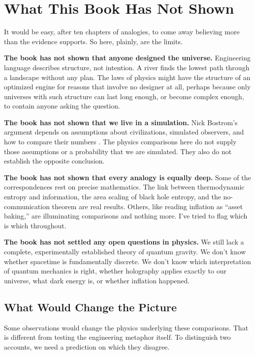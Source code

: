 \section{What This Book Has Not Shown}

It would be easy, after ten chapters of analogies, to come away believing more than the evidence supports. So here, plainly, are the limits.

\textbf{The book has not shown that anyone designed the universe.} Engineering language describes structure, not intention. A river finds the lowest path through a landscape without any plan. The laws of physics might have the structure of an optimized engine for reasons that involve no designer at all, perhaps because only universes with such structure can last long enough, or become complex enough, to contain anyone asking the question.

\textbf{The book has not shown that we live in a simulation.} Nick Bostrom's argument depends on assumptions about civilizations, simulated observers, and how to compare their numbers \cite{bostrom2003}. The physics comparisons here do not supply those assumptions or a probability that we are simulated. They also do not establish the opposite conclusion.

\textbf{The book has not shown that every analogy is equally deep.} Some of the correspondences rest on precise mathematics. The link between thermodynamic entropy and information, the area scaling of black hole entropy, and the no-communication theorem are real results. Others, like reading inflation as ``asset baking,'' are illuminating comparisons and nothing more. I've tried to flag which is which throughout.

\textbf{The book has not settled any open questions in physics.} We still lack a complete, experimentally established theory of quantum gravity. We don't know whether spacetime is fundamentally discrete. We don't know which interpretation of quantum mechanics is right, whether holography applies exactly to our universe, what dark energy is, or whether inflation happened.

\subsection{What Would Change the Picture}

Some observations would change the physics underlying these comparisons. That is different from testing the engineering metaphor itself. To distinguish two accounts, we need a prediction on which they disagree.

